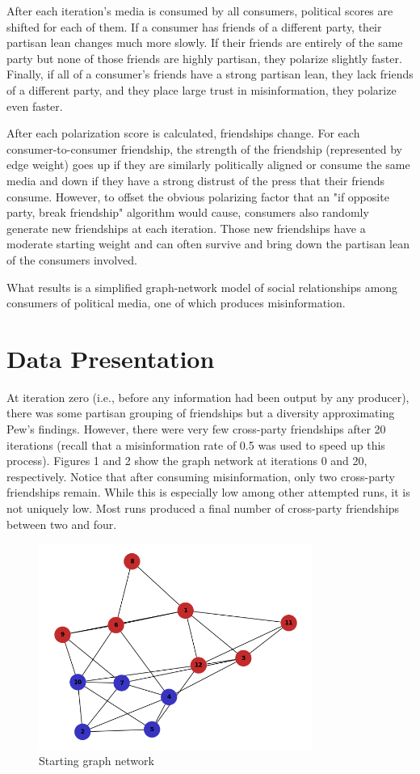 \documentclass[titlepage, 12pt, leqno]{article}
\begin{document}
After each iteration's media is consumed by all consumers, political scores are shifted for each of them. If a consumer has friends of a different party, their partisan lean changes much more slowly. If their friends are entirely of the same party but none of those friends are highly partisan, they polarize slightly faster. Finally, if all of a consumer's friends have a strong partisan lean, they lack friends of a different party, and they place large trust in misinformation, they polarize even faster.

After each polarization score is calculated, friendships change. For each consumer-to-consumer friendship, the strength of the friendship (represented by edge weight) goes up if they are similarly politically aligned or consume the same media and down if they have a strong distrust of the press that their friends consume. However, to offset the obvious polarizing factor that an "if opposite party, break friendship" algorithm would cause, consumers also randomly generate new friendships at each iteration. Those new friendships have a moderate starting weight and can often survive and bring down the partisan lean of the consumers involved.

What results is a simplified graph-network model of social relationships among consumers of political media, one of which produces misinformation. 

\pagebreak
\section{Data Presentation}
At iteration zero (i.e., before any information had been output by any producer), there was some partisan grouping of friendships but a diversity approximating Pew's findings. However, there were very few cross-party friendships after 20 iterations (recall that a misinformation rate of 0.5 was used to speed up this process). Figures 1 and 2 show the graph network at iterations 0 and 20, respectively. Notice that after consuming misinformation, only two cross-party friendships remain. While this is especially low among other attempted runs, it is not uniquely low. Most runs produced a final number of cross-party friendships between two and four.

\begin{figure}[ht]
    \centering
    \includegraphics[width=0.8\textwidth]{../plots/graph_iter0.png}
    \caption{Starting graph network}
\end{figure}
\end{document}
